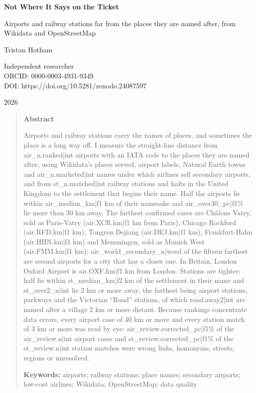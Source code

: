 \documentclass[11pt,a4paper]{article}
\begin{document}
\begin{center}
{\Large\bfseries Not Where It Says on the Ticket\par}
\vspace{0.4em}
{\large Airports and railway stations far from the places they are named after, from Wikidata and OpenStreetMap\par}
\vspace{1.2em}
{\large Tristan Hotham\par}
\vspace{0.3em}
{\small Independent researcher\\
ORCID: 0000-0003-4931-9349\\
DOI: https://doi.org/10.5281/zenodo.24087597\par}
\vspace{0.8em}
2026
\end{center}

\begin{quote}
\small
\begin{center}\textbf{Abstract}\end{center}
Airports and railway stations carry the names of places, and sometimes the place is a long way off. I measure the straight-line distance from {{air_n.ranked|int}} airports with an IATA code to the places they are named after, using Wikidata's places served, airport labels, Natural Earth towns and {{air_n.marketed|int}} names under which airlines sell secondary airports, and from {{st_n.matched|int}} railway stations and halts in the United Kingdom to the settlement that begins their name. Half the airports lie within {{air_median_km|f1}} km of their namesake and {{air_over30_pc|f1}}\% lie more than 30 km away. The farthest confirmed cases are Châlons Vatry, sold as Paris-Vatry ({{air.XCR.km|f1}} km from Paris), Chicago Rockford ({{air.RFD.km|f1}} km), Tongren Dejiang ({{air.DEJ.km|f1}} km), Frankfurt-Hahn ({{air.HHN.km|f1}} km) and Memmingen, sold as Munich West ({{air.FMM.km|f1}} km); {{air_world_secondary_n|word}} of the fifteen farthest are second airports for a city that has a closer one. In Britain, London Oxford Airport is {{air.OXF.km|f1}} km from London. Stations are tighter: half lie within {{st_median_km|f2}} km of the settlement in their name and {{st_over2_n|int}} lie 2 km or more away, the farthest being airport stations, parkways and the Victorian ``Road'' stations, of which {{road.away2|int}} are named after a village 2 km or more distant. Because rankings concentrate data errors, every airport case of 40 km or more and every station match of 3 km or more was read by eye: {{air_review.corrected_pc|f1}}\% of the {{air_review.n|int}} airport cases and {{st_review.corrected_pc|f1}}\% of the {{st_review.n|int}} station matches were wrong links, homonyms, streets, regions or unresolved.

\textbf{Keywords:} airports; railway stations; place names; secondary airports; low-cost airlines; Wikidata; OpenStreetMap; data quality
\end{quote}
\end{document}
